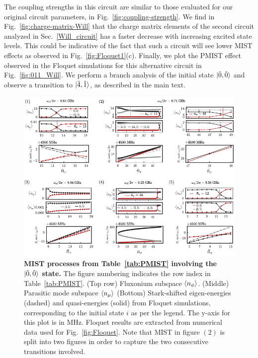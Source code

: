 \documentclass[%
reprint,
superscriptaddress,
 amsmath,amssymb,
 aps,
 prx,
longbibliography,
floatfix,
]{revtex4-2}
\begin{document}
The coupling strengths in this circuit are similar to those evaluated for our original circuit parameters, in Fig.~\ref{fig:coupling-strength}. We find in Fig.~\ref{fig:charge-matrix-Will} that the charge matrix elements of the second circuit analyzed in Sec.~\ref{Will_circuit} has a faster decrease with increasing excited state levels. This could be indicative of the fact that such a circuit will see lower MIST effects as observed in Fig.~\ref{fig:Floquet1}(c). Finally, we plot the PMIST effect observed in the Floquet simulations for this alternative circuit in Fig.~\ref{fig:011_Will}. We perform a branch analysis of the initial state $\ket{\tilde{0}, \tilde{0}}$ and observe a transition to $\ket{\tilde{4},\tilde{1}}$, as described in the main text. 
\begin{figure}
    \centering
    \includegraphics[width=1.0\textwidth]{Supp_Fig/Trans0.pdf}
    \caption{\textbf{MIST processes from Table~\ref{tab:PMIST} involving the $\ket{\tilde{0},\tilde{0}}$ state.} The figure numbering indicates the row index in Table~\ref{tab:PMIST}. (Top row) Fluxonium subspace $\braket{n_\phi}$. (Middle) Parasitic mode subspace $\braket{n_\mu}$ (Bottom) Stark-shifted eigen-energies (dashed) and quasi-energies (solid) from Floquet simulations, corresponding to the initial state $i$ as per the legend. The y-axis for this plot is in MHz. Floquet results are extracted from numerical data used for Fig.~\ref{fig:Floquet}. Note that MIST in figure $(2)$ is split into two figures in order to capture the two consecutive transitions involved.}
    \label{fig:Trans0}
\end{figure}
\end{document}
